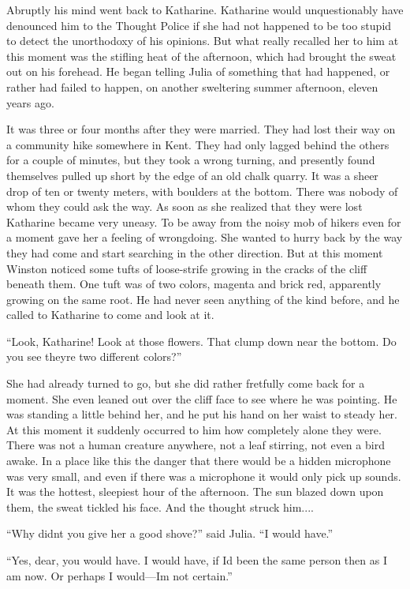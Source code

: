 Abruptly his mind went back to Katharine. Katharine would unquestionably
have denounced him to the Thought Police if she had not happened to be
too stupid to detect the unorthodoxy of his opinions. But what really
recalled her to him at this moment was the stifling heat of the
afternoon, which had brought the sweat out on his forehead. He began
telling Julia of something that had happened, or rather had failed to
happen, on another sweltering summer afternoon, eleven years ago.

It was three or four months after they were married. They had lost their
way on a community hike somewhere in Kent. They had only lagged behind
the others for a couple of minutes, but they took a wrong turning, and
presently found themselves pulled up short by the edge of an old chalk
quarry. It was a sheer drop of ten or twenty meters, with boulders at
the bottom. There was nobody of whom they could ask the way. As soon as
she realized that they were lost Katharine became very uneasy. To be
away from the noisy mob of hikers even for a moment gave her a feeling
of wrongdoing. She wanted to hurry back by the way they had come and
start searching in the other direction. But at this moment Winston
noticed some tufts of loose-strife growing in the cracks of the cliff
beneath them. One tuft was of two colors, magenta and brick red,
apparently growing on the same root. He had never seen anything of the
kind before, and he called to Katharine to come and look at it.

``Look, Katharine! Look at those flowers. That clump down near the
bottom. Do you see they\textquotesingle re two different colors?''

She had already turned to go, but she did rather fretfully come back for
a moment. She even leaned out over the cliff face to see where he was
pointing. He was standing a little behind her, and he put his hand on
her waist to steady her. At this moment it suddenly occurred to him how
completely alone they were. There was not a human creature anywhere, not
a leaf stirring, not even a bird awake. In a place like this the danger
that there would be a hidden microphone was very small, and even if
there was a microphone it would only pick up sounds. It was the hottest,
sleepiest hour of the afternoon. The sun blazed down upon them, the
sweat tickled his face. And the thought struck him....

``Why didn\textquotesingle t you give her a good shove?'' said Julia. ``I
would have.''

``Yes, dear, you would have. I would have, if I\textquotesingle d been
the same person then as I am now. Or perhaps I
would---I\textquotesingle m not certain.''

